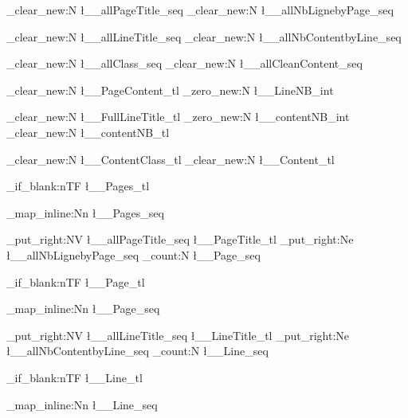 \ExplSyntaxOn
\NewDocumentCommand{}
{    
    \seq_clear_new:N \l__allPageTitle_seq
    \seq_clear_new:N \l__allNbLignebyPage_seq
    
    \seq_clear_new:N \l__allLineTitle_seq
    \seq_clear_new:N \l__allNbContentbyLine_seq
    
    \seq_clear_new:N \l__allClass_seq
    \seq_clear_new:N \l__allCleanContent_seq

    \tl_clear_new:N \l__PageContent_tl
    \int_zero_new:N \l__LineNB_int

    \tl_clear_new:N \l__FullLineTitle_tl
    \int_zero_new:N \l__contentNB_int
    \tl_clear_new:N \l__contentNB_tl

    \tl_clear_new:N \l__ContentClass_tl
    \tl_clear_new:N \l__Content_tl
    
    
    

    \tl_if_blank:nTF {\l__Pages_tl}
        {}%
        {%
            \seq_map_inline:Nn \l__Pages_seq 
            {
            
            \seq_put_right:NV \l__allPageTitle_seq \l__PageTitle_tl
            \seq_put_right:Ne \l__allNbLignebyPage_seq {\seq_count:N \l__Page_seq}
            

            \tl_if_blank:nTF {\l__Page_tl}
                {}%
                {%
                \seq_map_inline:Nn \l__Page_seq
                    {                   
                    
                    \seq_put_right:NV \l__allLineTitle_seq \l__LineTitle_tl
                    \seq_put_right:Ne \l__allNbContentbyLine_seq {\seq_count:N \l__Line_seq}
                    
                    \tl_if_blank:nTF {\l__Line_tl}
                        {}%
                        {%
                        \seq_map_inline:Nn \l__Line_seq
                            {                   

}}}}}}}
